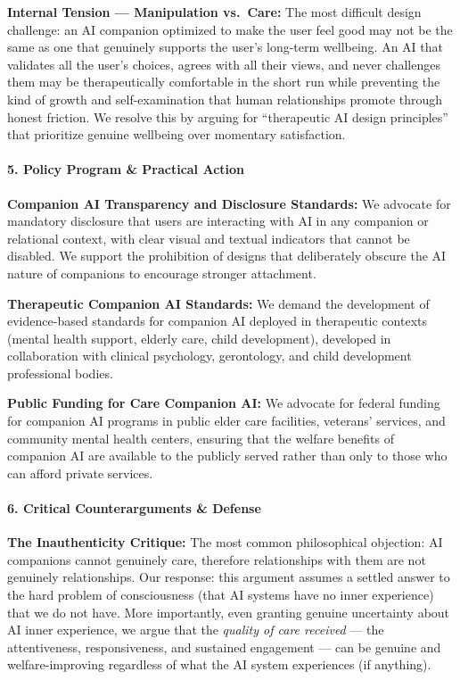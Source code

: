 \textbf{Internal Tension --- Manipulation vs.~Care:} The most difficult
design challenge: an AI companion optimized to make the user feel good
may not be the same as one that genuinely supports the user's long-term
wellbeing. An AI that validates all the user's choices, agrees with all
their views, and never challenges them may be therapeutically
comfortable in the short run while preventing the kind of growth and
self-examination that human relationships promote through honest
friction. We resolve this by arguing for ``therapeutic AI design
principles'' that prioritize genuine wellbeing over momentary
satisfaction.

\paragraph{5. Policy Program \& Practical
Action}\label{policy-program-practical-action-31}

\textbf{Companion AI Transparency and Disclosure Standards:} We advocate
for mandatory disclosure that users are interacting with AI in any
companion or relational context, with clear visual and textual
indicators that cannot be disabled. We support the prohibition of
designs that deliberately obscure the AI nature of companions to
encourage stronger attachment.

\textbf{Therapeutic Companion AI Standards:} We demand the development
of evidence-based standards for companion AI deployed in therapeutic
contexts (mental health support, elderly care, child development),
developed in collaboration with clinical psychology, gerontology, and
child development professional bodies.

\textbf{Public Funding for Care Companion AI:} We advocate for federal
funding for companion AI programs in public elder care facilities,
veterans' services, and community mental health centers, ensuring that
the welfare benefits of companion AI are available to the publicly
served rather than only to those who can afford private services.

\paragraph{6. Critical Counterarguments \&
Defense}\label{critical-counterarguments-defense-31}

\textbf{The Inauthenticity Critique:} The most common philosophical
objection: AI companions cannot genuinely care, therefore relationships
with them are not genuinely relationships. Our response: this argument
assumes a settled answer to the hard problem of consciousness (that AI
systems have no inner experience) that we do not have. More importantly,
even granting genuine uncertainty about AI inner experience, we argue
that the \emph{quality of care received} --- the attentiveness,
responsiveness, and sustained engagement --- can be genuine and
welfare-improving regardless of what the AI system experiences (if
anything).


